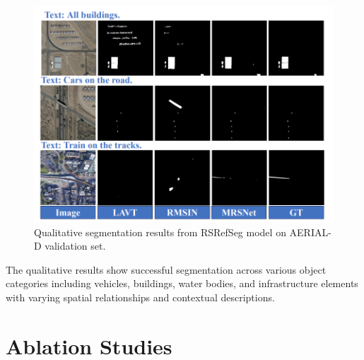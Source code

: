 \begin{figure}[H]
\centering
\includegraphics[width=\textwidth]{./Images/qualitative.png}
\caption{Qualitative segmentation results from RSRefSeg model on AERIAL-D validation set.}
\label{fig:qualitative_examples}
\end{figure}

The qualitative results show successful segmentation across various object categories including vehicles, buildings, water bodies, and infrastructure elements with varying spatial relationships and contextual descriptions.

\section{Ablation Studies}

\begin{table}[H]
\centering
\caption{Ablation Study: Expression Type Training Analysis}
\label{tab:ablation_expression_types}
\end{table}

